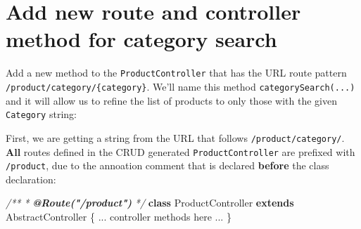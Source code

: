 \documentclass[a4paperpaper,openright]{book}
\newenvironment{Shaded}{}{}
\newcommand{\AnnotationTok}[1]{\textcolor[rgb]{0.38,0.63,0.69}{\textbf{\textit{#1}}}}
\newcommand{\CommentTok}[1]{\textcolor[rgb]{0.38,0.63,0.69}{\textit{#1}}}
\newcommand{\KeywordTok}[1]{\textcolor[rgb]{0.00,0.44,0.13}{\textbf{#1}}}
\newcommand{\NormalTok}[1]{#1}
\newcommand{\OtherTok}[1]{\textcolor[rgb]{0.00,0.44,0.13}{#1}}
\newcommand{\StringTok}[1]{\textcolor[rgb]{0.25,0.44,0.63}{#1}}
\begin{document}
\hypertarget{add-new-route-and-controller-method-for-category-search}{%
\section{Add new route and controller method for category
search}\label{add-new-route-and-controller-method-for-category-search}}

Add a new method to the \texttt{ProductController} that has the URL
route pattern \texttt{/product/category/\{category\}}. We'll name this
method \texttt{categorySearch(...)} and it will allow us to refine the
list of products to only those with the given \texttt{Category} string:

\begin{Shaded}
\end{Shaded}

First, we are getting a string from the URL that follows
\texttt{/product/category/}. \textbf{All} routes defined in the CRUD
generated \texttt{ProductController} are prefixed with
\texttt{/product}, due to the annoation comment that is declared
\textbf{before} the class declaration:

\begin{Shaded}
\begin{Highlighting}[]
    \CommentTok{/**}
\CommentTok{     * }\AnnotationTok{@Route("/product")}
\CommentTok{     */}
    \KeywordTok{class}\NormalTok{ ProductController }\KeywordTok{extends}\NormalTok{ AbstractController}
\NormalTok{    \{}
        \StringTok{...}\NormalTok{ controller methods here }\StringTok{...}
\NormalTok{    \}}
\end{Highlighting}
\end{Shaded}
\end{document}
